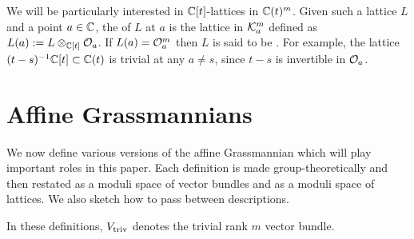 \documentclass{article}
\begin{document}
We will be particularly interested in $\mathbb C[t]$-lattices in $ \mathbb C(t)^m$. Given such a lattice $ L $ and a point $ a \in \mathbb C$, the  of $ L $ at $ a $ is the lattice in $\mathcal K_a^m$ defined as $ L(a) := L \otimes_{\mathbb C[t]} \mathcal O_a $. 
If $L(a) = \mathcal O_a^m$ then $L$ is said to be . 
For example, the lattice $(t-s)^{-1}\mathbb C[t] \subset \mathbb C(t)$ is trivial at any $a\ne s$, since $ t-s $ is invertible in $ \mathcal O_a$. 

\section{Affine Grassmannians} 
\label{s:affgrs}
% 
We now define various versions of the affine Grassmannian which will play important roles in this paper. 
% 
Each definition is made group-theoretically and then restated as a moduli space of vector bundles and as a moduli space of lattices.
% 
We also sketch how to pass between descriptions.  

In these definitions, $ V_{\mathrm{triv}}$ denotes the trivial rank $ m $ vector bundle. 
\end{document}
